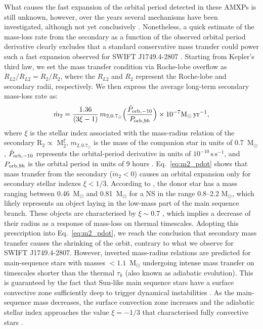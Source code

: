 \documentclass[fleqn,usenatbib]{mnras}
\newcommand{\swiftj}{SWIFT J1749.4-2807}
\begin{document}
What causes the fast expansion of the orbital period detected in these AMXPs is still unknown, however, over the years several mechanisms have been investigated, although not yet conclusively \citep[see e.g.,][]{di-Salvo:2008uu, Hartman:2008uj,Burderi:2009td, Patruno:2012tw, Sanna:2017vj, Sanna:2018tx}. Nonetheless, a quick estimate of the mass-loss rate from the secondary as a function of the observed orbital period derivative clearly excludes that a standard conservative mass transfer could power such a fast expansion observed for \swiftj{} \citep[similar conclusions have been drawn for SAX J1808.4-3658, see e.g.,][]{Sanna:2017vj}. Starting from Kepler's third law, we set the mass transfer condition via Roche-lobe overflow as $\dot{R}_{L2}/R_{L2}=\dot{R}_2/R_{2}$, where the $R_{L2}$ and $R_{2}$ represent the Roche-lobe and secondary radii, respectively. We then express the average long-term secondary mass-loss rate as: 
\begin{eqnarray}
\label{eq:m2_pdot}
\dot{m}_{2}=\frac{1.36}{(3\xi-1)}\,m_{2,0.7_{\odot{}}}\Big(\frac{\dot{P}_{{\rm orb},-10}}{P_{{\rm orb},9h}}\Big)\times 10^{-7} \text{M}_{\odot}\, \text{yr}^{-1} ,
\end{eqnarray}
where $\xi$ is the stellar index associated with the mass-radius relation of the secondary R$_2\propto$ M$_2^\xi$, $m_{2,0.7_\odot{}}$ is the mass of the companion star in units of 0.7~M$_{\odot}$, $\dot{P}_{{\rm orb},-10}$ represents the orbital-period derivative in units of $10^{-10}\,\text{s}\,\text{s}^{-1}$, and $P_{{\rm orb},9h}$ is the orbital period in units of 9 hours \citep[see e.g.,][for more details on the derivation of the expression]{Burderi:2010tk}. Eq.~\ref{eq:m2_pdot} shows that mass transfer from the secondary ($\dot{m}_{2} < 0$) causes an orbital expansion only for secondary stellar indexes $\xi<1/3$. According to \citet{Markwardt:2010tl}, the donor star has a mass ranging between 0.46~M$_\odot$ and 0.81~M$_\odot$ for a NS in the range 0.8--2.2 M$_\odot$, which likely represents an object laying in the low-mass part of the main sequence branch. These objects are characterised by $\xi\sim0.7$ \citep[see e.g.,][]{Chabrier:2009vh}, which implies a decrease of their radius as a response of mass-loss on thermal timescales. Adopting this prescription into Eq.~\ref{eq:m2_pdot}, we reach the conclusion that secondary mass transfer causes the shrinking of the orbit, contrary to what we observe for \swiftj{}. However, inverted mass-radius relations are predicted for main-sequence stars with masses $<1.1$~M$_{\odot}$ undergoing intense mass transfer on timescales shorter than the thermal $\tau_k$ (also known as adiabatic evolution). This is guaranteed by the fact that Sun-like main sequence stars have a surface convective zone sufficiently deep to trigger dynamical instabilities \citep[see e.g.,][]{Ge:2015ug}. As the main-sequence mass decreases, the surface convection zone increases and the adiabatic stellar index approaches the value $\xi=-1/3$ that characterised fully convective stars \citep[well described with an n=3/2 polytrope, see e.g.,][]{Rappaport:1982vc}. 
\end{document}
